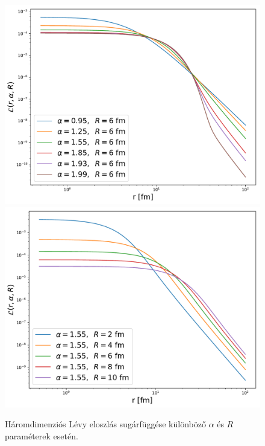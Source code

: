 \documentclass[11pt,a4paper]{article}
\numberwithin{equation}{subsection}
\numberwithin{figure}{section}
\begin{document}
\begin{figure}[H]
\centering
\includegraphics[scale=0.35]{pic/BEintro/Levy_alpha.pdf}
\includegraphics[scale=0.35]{pic/BEintro/Levy_R.pdf}
\caption{Háromdimenziós Lévy eloszlás sugárfüggése különböző $\alpha$ és $R$ paraméterek esetén.}
\label{fig:Levy}
\end{figure}
\end{document}
